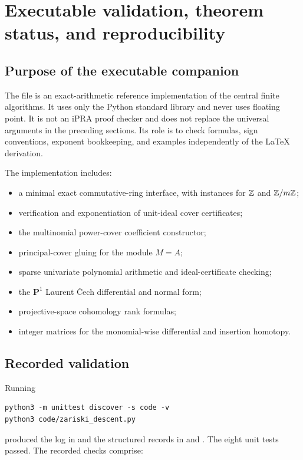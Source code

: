 \section{Executable validation, theorem status, and reproducibility}

\subsection{Purpose of the executable companion}

The file  is an exact-arithmetic reference implementation of the
central finite algorithms.  It uses only the Python standard library and never uses floating point.
It is not an iPRA proof checker and does not replace the universal arguments in the preceding
sections.  Its role is to check formulas, sign conventions, exponent bookkeeping, and examples
independently of the LaTeX derivation.

The implementation includes:
\begin{itemize}
\item a minimal exact commutative-ring interface, with instances for $\mathbb Z$ and $\mathbb Z/m\mathbb Z$;
\item verification and exponentiation of unit-ideal cover certificates;
\item the multinomial power-cover coefficient constructor;
\item principal-cover gluing for the module $M=A$;
\item sparse univariate polynomial arithmetic and ideal-certificate checking;
\item the $\mathbf P^1$ Laurent \v{C}ech differential and normal form;
\item projective-space cohomology rank formulas;
\item integer matrices for the monomial-wise differential and insertion homotopy.
\end{itemize}

\subsection{Recorded validation}

Running
\begin{lstlisting}[language={}] 
python3 -m unittest discover -s code -v
python3 code/zariski_descent.py
\end{lstlisting}
produced the log in  and the structured records in
 and .  The eight unit tests
passed.  The recorded checks comprise:

